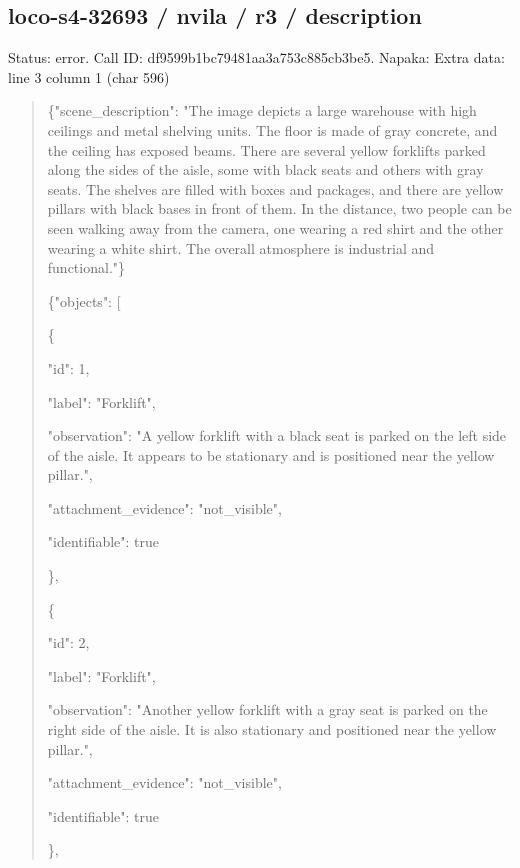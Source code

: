 \documentclass[10pt,a4paper]{article}
\begin{document}
\subsection*{loco-s4-32693 / nvila / r3 / description}
Status: error. Call ID: df9599b1bc79481aa3a753c885cb3be5. Napaka: Extra data: line 3 column 1 (char 596)
\begin{quote}\footnotesize
\{"scene\_description":\allowbreak{} "The image depicts a large warehouse with high ceilings and metal shelving units. The floor is made of gray concrete,\allowbreak{} and the ceiling has exposed beams. There are several yellow forklifts parked along the sides of the aisle,\allowbreak{} some with black seats and others with gray seats. The shelves are filled with boxes and packages,\allowbreak{} and there are yellow pillars with black bases in front of them. In the distance,\allowbreak{} two people can be seen walking away from the camera,\allowbreak{} one wearing a red shirt and the other wearing a white shirt. The overall atmosphere is industrial and functional."\}\par
\par
\{"objects":\allowbreak{} [\par
\{\par
"id":\allowbreak{} 1,\allowbreak{}\par
"label":\allowbreak{} "Forklift",\allowbreak{}\par
"observation":\allowbreak{} "A yellow forklift with a black seat is parked on the left side of the aisle. It appears to be stationary and is positioned near the yellow pillar.",\allowbreak{}\par
"attachment\_evidence":\allowbreak{} "not\_visible",\allowbreak{}\par
"identifiable":\allowbreak{} true\par
\},\allowbreak{}\par
\{\par
"id":\allowbreak{} 2,\allowbreak{}\par
"label":\allowbreak{} "Forklift",\allowbreak{}\par
"observation":\allowbreak{} "Another yellow forklift with a gray seat is parked on the right side of the aisle. It is also stationary and positioned near the yellow pillar.",\allowbreak{}\par
"attachment\_evidence":\allowbreak{} "not\_visible",\allowbreak{}\par
"identifiable":\allowbreak{} true\par
\},\allowbreak{}\par

\end{quote}
\end{document}
